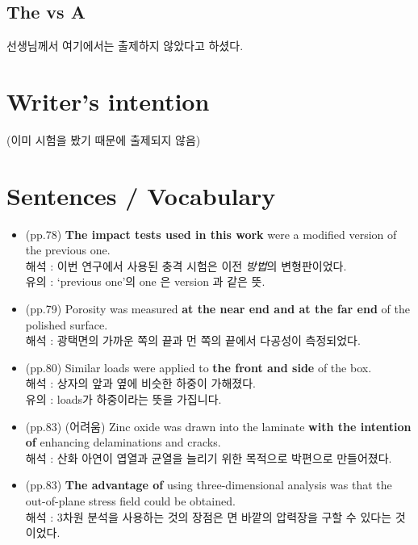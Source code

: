 \documentclass[10pt]{report}
\begin{document}
	\subsection{The vs A}
	선생님께서 여기에서는 출제하지 않았다고 하셨다.
	
	\section{Writer's intention}
	(이미 시험을 봤기 때문에 출제되지 않음)
	
	\section{Sentences / Vocabulary}
	\begin{itemize}
		\item (pp.78) {\bf The impact tests used in this work} were a modified version of the previous one. \\
		해석 : 이번 연구에서 사용된 충격 시험은 이전 \textit{방법}의 변형판이었다. \\
		유의 : `previous one'의 one 은 version 과 같은 뜻.
		\item (pp.79) Porosity was measured {\bf at the near end and at the far end} of the polished surface. \\
		해석 : 광택면의 가까운 쪽의 끝과 먼 쪽의 끝에서 다공성이 측정되었다.
		\item (pp.80) Similar loads were applied to {\bf the front and side} of the box. \\
		해석 : 상자의 앞과 옆에 비슷한 하중이 가해졌다. \\
		유의 : loads가 하중이라는 뜻을 가집니다.
		\item (pp.83) (어려움) Zinc oxide was drawn into the laminate {\bf with the intention of} enhancing delaminations and cracks. \\
		해석 : 산화 아연이 엽열과 균열을 늘리기 위한 목적으로 박편으로 만들어졌다.
		\item (pp.83) {\bf The advantage of} using three-dimensional analysis was that the out-of-plane stress field could be obtained. \\
		해석 : 3차원 분석을 사용하는 것의 장점은 면 바깥의 압력장을 구할 수 있다는 것이었다.

\end{itemize}
\end{document}
